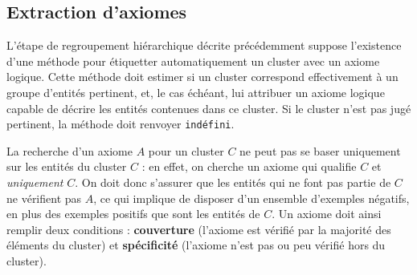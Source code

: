 %



\subsection{Extraction d'axiomes}
\label{subsec:texp-exaxiom}

L'étape de regroupement hiérarchique décrite précédemment suppose l'existence d'une méthode pour étiquetter automatiquement un cluster avec un axiome logique. Cette méthode doit estimer si un cluster correspond effectivement à un groupe d'entités pertinent, et, le cas échéant, lui attribuer un axiome logique capable de décrire les entités contenues dans ce cluster. Si le cluster n'est pas jugé pertinent, la méthode doit renvoyer \texttt{indéfini}.

La recherche d'un axiome $A$ pour un cluster $C$ ne peut pas se baser uniquement sur les entités du cluster $C$ : en effet, on cherche un axiome qui qualifie $C$ et \textit{uniquement} $C$. On doit donc s'assurer que les entités qui ne font pas partie de $C$ ne vérifient pas $A$, ce qui implique de disposer d'un ensemble d'exemples négatifs, en plus des exemples positifs que sont les entités de $C$. Un axiome doit ainsi remplir deux conditions : \textbf{couverture} (l'axiome est vérifié par la majorité des éléments du cluster) et \textbf{spécificité} (l'axiome n'est pas ou peu vérifié hors du cluster). 

